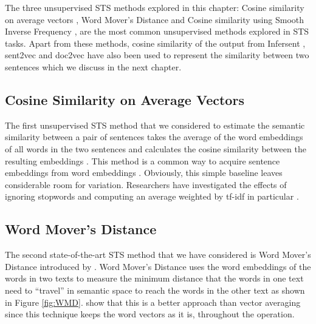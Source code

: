 The three unsupervised STS methods explored in this chapter: Cosine similarity on average vectors \autocite{mitchell-lapata-2008-vector}, Word Mover's Distance \autocite{10.5555/3045118.3045221} and Cosine similarity using Smooth Inverse Frequency \autocite{DBLP:conf/iclr/AroraLM17}, are the most common unsupervised methods explored in STS tasks. Apart from these methods, cosine similarity of the output from Infersent \autocite{conneau-EtAl:2017:EMNLP2017}, sent2vec \autocite{pagliardini-etal-2018-unsupervised} and doc2vec \autocite{pmlr-v32-le14} have also been used to represent the similarity between two sentences which we discuss in the next chapter. 


\subsection{Cosine Similarity on Average Vectors}
The first unsupervised STS method that we considered to estimate the semantic similarity between a pair of sentences takes the average of the word embeddings of all words in the two sentences and calculates the cosine similarity between the resulting embeddings \autocite{mitchell-lapata-2008-vector}. This method is a common way to acquire sentence embeddings from word embeddings \autocite{orasan-2018-aggressive}. Obviously, this simple baseline leaves considerable room for variation. Researchers have investigated the effects of ignoring stopwords and computing an average weighted by tf-idf in particular \autocite{j.1551-6709.2010.01106.x}.

\subsection{Word Mover's Distance}
The second state-of-the-art STS method that we have considered is Word Mover's Distance introduced by \textcite{10.5555/3045118.3045221}. Word Mover's Distance uses the word embeddings of the words in two texts to measure the minimum distance that the words in one text need to ``travel'' in semantic space to reach the words in the other text as shown in Figure \ref{fig:WMD}. \textcite{10.5555/3045118.3045221} show that this is a better approach than vector averaging since this technique keeps the word vectors as it is, throughout the operation.

